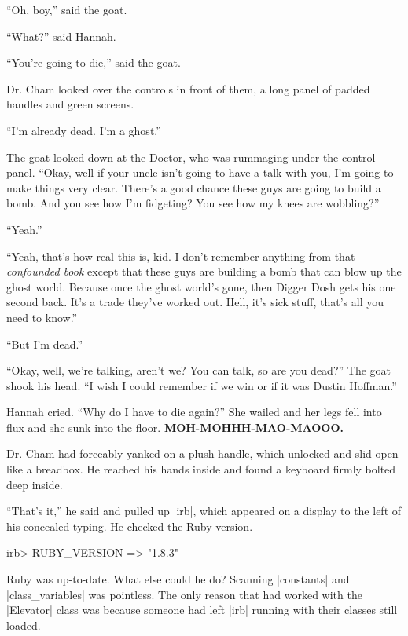 \documentclass[12pt,twoside]{report}
\begin{document}
``Oh, boy,'' said the goat.

``What?'' said Hannah.

``You're going to die,'' said the goat.

Dr. Cham looked over the controls in front of them, a long panel of
padded handles and green screens.

``I'm already dead.  I'm a ghost.''

The goat looked down at the Doctor, who was rummaging under the
control panel.  ``Okay, well if your uncle isn't going to have a talk
with you, I'm going to make things very clear.  There's a good chance
these guys are going to build a bomb.  And you see how I'm fidgeting?
You see how my knees are wobbling?''

``Yeah.''

``Yeah, that's how real this is, kid.  I don't remember anything from
that {\em confounded book} except that these guys are building a bomb
that can blow up the ghost world.  Because once the ghost world's
gone, then Digger Dosh gets his one second back.  It's a trade they've
worked out.  Hell, it's sick stuff, that's all you need to know.''

``But I'm dead.''

``Okay, well, we're talking, aren't we?  You can talk, so are you
dead?''  The goat shook his head. ``I wish I could remember if we win
or if it was Dustin Hoffman.''

Hannah cried.  ``Why do I have to die again?''  She wailed and her
legs fell into flux and she sunk into the floor.  {\bf
  MOH-MOHHH-MAO-MAOOO.}

Dr. Cham had forceably yanked on a plush handle, which unlocked and
slid open like a breadbox. He reached his hands inside and found a
keyboard firmly bolted deep inside.

``That's it,'' he said and pulled up \rubyinline|irb|,
which appeared on a display to the left of his concealed typing.  He
checked the Ruby version.


\begin{consolecode}

 irb> RUBY_VERSION
   => "1.8.3"

\end{consolecode}


Ruby was up-to-date.  What else could he do?  Scanning
\rubyinline|constants| and
\rubyinline|class_variables| was pointless. The only
reason that had worked with the \rubyinline|Elevator|
class was because someone had left \rubyinline|irb|
running with their classes still loaded.
\end{document}
